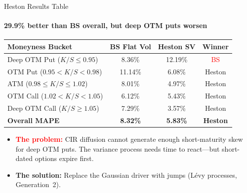\documentclass[aspectratio=169]{beamer}
\begin{document}
\begin{frame}{Heston Results Table}
\framesubtitle{29.9\% better than BS overall, but deep OTM puts worsen}

\centering
\small
\begin{tabular}{@{}lccc@{}}\toprule
\textbf{Moneyness Bucket} & \textbf{BS Flat Vol} & \textbf{Heston SV} & \textbf{Winner}\\
\midrule
Deep OTM Put ($K/S\leq 0.95$) & 8.36\% & 12.19\% & \textcolor{red}{BS}\\
OTM Put ($0.95 < K/S < 0.98$) & 11.14\% & 6.08\% & \textcolor{gen1color}{Heston}\\
ATM ($0.98\leq K/S\leq 1.02$) & 8.01\% & 4.97\% & \textcolor{gen1color}{Heston}\\
OTM Call ($1.02 < K/S < 1.05$) & 6.12\% & 5.43\% & \textcolor{gen1color}{Heston}\\
Deep OTM Call ($K/S\geq 1.05$) & 7.29\% & 3.57\% & \textcolor{gen1color}{Heston}\\
\midrule
\bfseries Overall MAPE & \bfseries 8.32\% & \bfseries 5.83\% & \textcolor{gen1color}{\bfseries Heston}\\
\bottomrule
\end{tabular}

\vspace{0.3cm}
\begin{itemize}
    \item \textcolor{red}{\textbf{The problem:}} CIR diffusion cannot generate enough short-maturity skew for deep OTM puts. The variance process needs time to react---but short-dated options expire first.
    \item \textcolor{bbgorange}{\textbf{The solution:}} Replace the Gaussian driver with jumps (L\'evy processes, Generation~2).
\end{itemize}

\end{frame}

\end{document}
